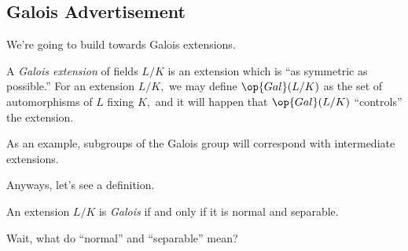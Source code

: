 \documentclass[../notes.tex]{subfiles}
\begin{document}
\subsection{Galois Advertisement}
We're going to build towards Galois extensions.
\begin{idea}
	A \textit{Galois extension} of fields $L/K$ is an extension which is ``as symmetric as possible.'' For an extension $L/K,$ we may define $\op{Gal}(L/K)$ as the set of automorphisms of $L$ fixing $K,$ and it will happen that $\op{Gal}(L/K)$ ``controls'' the extension.
\end{idea}
As an example, subgroups of the Galois group will correspond with intermediate extensions.

Anyways, let's see a definition.
\begin{definition} \label{defi:gali}
	An extension $L/K$ is \textit{Galois} if and only if it is normal and separable.
\end{definition}
Wait, what do ``normal'' and ``separable'' mean?
\end{document}
